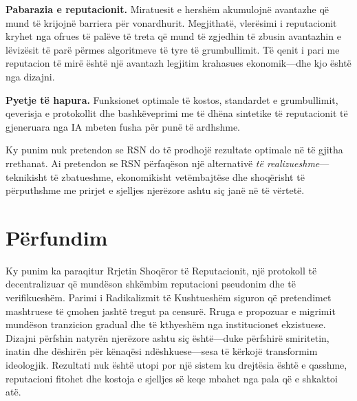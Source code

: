 \documentclass[11pt,a4paper,twocolumn]{article}
\begin{document}
\textbf{Pabarazia e reputacionit.} Miratuesit e hershëm akumulojnë avantazhe që mund të krijojnë barriera për vonardhurit. Megjithatë, vlerësimi i reputacionit kryhet nga ofrues të palëve të treta që mund të zgjedhin të zbusin avantazhin e lëvizësit të parë përmes algoritmeve të tyre të grumbullimit. Të qenit i pari me reputacion të mirë është një avantazh legjitim krahasues ekonomik---dhe kjo është nga dizajni.

\textbf{Pyetje të hapura.} Funksionet optimale të kostos, standardet e grumbullimit, qeverisja e protokollit dhe bashkëveprimi me të dhëna sintetike të reputacionit të gjeneruara nga IA mbeten fusha për punë të ardhshme.

Ky punim nuk pretendon se RSN do të prodhojë rezultate optimale në të gjitha rrethanat. Ai pretendon se RSN përfaqëson një alternativë \emph{të realizueshme}---teknikisht të zbatueshme, ekonomikisht vetëmbajtëse dhe shoqërisht të përputhshme me prirjet e sjelljes njerëzore ashtu siç janë në të vërtetë.

\section{Përfundim}

Ky punim ka paraqitur Rrjetin Shoqëror të Reputacionit, një protokoll të decentralizuar që mundëson shkëmbim reputacioni pseudonim dhe të verifikueshëm. Parimi i Radikalizmit të Kushtueshëm siguron që pretendimet mashtruese të çmohen jashtë tregut pa censurë. Rruga e propozuar e migrimit mundëson tranzicion gradual dhe të kthyeshëm nga institucionet ekzistuese. Dizajni përfshin natyrën njerëzore ashtu siç është---duke përfshirë smiritetin, inatin dhe dëshirën për kënaqësi ndëshkuese---sesa të kërkojë transformim ideologjik. Rezultati nuk është utopi por një sistem ku drejtësia është e qasshme, reputacioni fitohet dhe kostoja e sjelljes së keqe mbahet nga pala që e shkaktoi atë.


\end{document}
